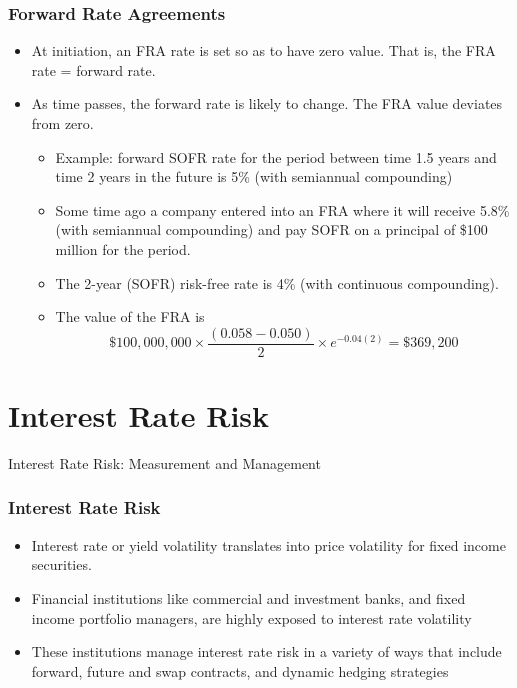 \documentclass[10pt]{beamer}
\begin{document}
\begin{frame}
	\frametitle{Forward Rate Agreements}
	\begin{itemize} \itemsep15pt
		\item At initiation, an FRA rate is set so as to have zero value. That is, the FRA rate = forward rate.
		
		\item As time passes, the forward rate is likely to change. The FRA value deviates from zero.
		
		\begin{itemize}
			\item Example: forward SOFR rate for the period between time 1.5 years and time 2 years in the future is 5\% (with semiannual compounding) 
			\item Some time ago a company entered into an FRA where it will receive 5.8\% (with semiannual compounding) and pay SOFR on a principal of \$100 million for the
			period. 
			\item The 2-year (SOFR) risk-free rate is 4\% (with continuous compounding). 
			\item The value of the FRA is
			$$
			\$100,000,000 \times \frac{(0.058 - 0.050)}{2} \times e^{-0.04(2)} = \$369,200
			$$
		\end{itemize}
		
	\end{itemize}
\end{frame}





\section{Interest Rate Risk}


\begin{frame}
	\begin{center}
		{\Large Interest Rate Risk: Measurement and Management}
	\end{center}
\end{frame}




\begin{frame}
	\frametitle{Interest Rate Risk}
	\begin{itemize} \itemsep20pt
		\item Interest rate or yield volatility translates into price volatility for fixed income securities.
		
		\item Financial institutions like commercial and investment banks, and fixed
		income portfolio managers, are highly exposed to interest rate volatility
		
		\item These institutions manage interest rate risk in a variety of ways that include
		forward, future and swap contracts, and dynamic hedging strategies
	\end{itemize}
\end{frame}
\end{document}
